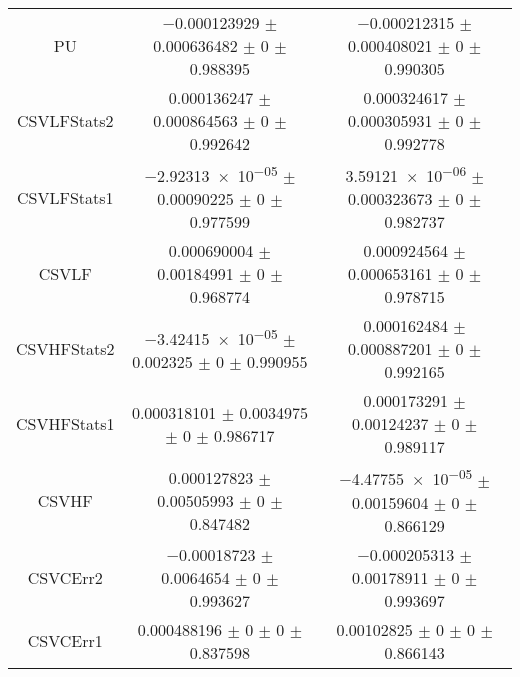 \begin{table}
\begin{tabular}{ccc}
PU & \num{-0.000123929} $\pm$ \num{0.000636482} $\pm$ \num{0} $\pm$ \num{0.988395} & \num{-0.000212315} $\pm$ \num{0.000408021} $\pm$ \num{0} $\pm$ \num{0.990305}\\
CSVLFStats2 & \num{0.000136247} $\pm$ \num{0.000864563} $\pm$ \num{0} $\pm$ \num{0.992642} & \num{0.000324617} $\pm$ \num{0.000305931} $\pm$ \num{0} $\pm$ \num{0.992778}\\
CSVLFStats1 & \num{-2.92313e-05} $\pm$ \num{0.00090225} $\pm$ \num{0} $\pm$ \num{0.977599} & \num{3.59121e-06} $\pm$ \num{0.000323673} $\pm$ \num{0} $\pm$ \num{0.982737}\\
CSVLF & \num{0.000690004} $\pm$ \num{0.00184991} $\pm$ \num{0} $\pm$ \num{0.968774} & \num{0.000924564} $\pm$ \num{0.000653161} $\pm$ \num{0} $\pm$ \num{0.978715}\\
CSVHFStats2 & \num{-3.42415e-05} $\pm$ \num{0.002325} $\pm$ \num{0} $\pm$ \num{0.990955} & \num{0.000162484} $\pm$ \num{0.000887201} $\pm$ \num{0} $\pm$ \num{0.992165}\\
CSVHFStats1 & \num{0.000318101} $\pm$ \num{0.0034975} $\pm$ \num{0} $\pm$ \num{0.986717} & \num{0.000173291} $\pm$ \num{0.00124237} $\pm$ \num{0} $\pm$ \num{0.989117}\\
CSVHF & \num{0.000127823} $\pm$ \num{0.00505993} $\pm$ \num{0} $\pm$ \num{0.847482} & \num{-4.47755e-05} $\pm$ \num{0.00159604} $\pm$ \num{0} $\pm$ \num{0.866129}\\
CSVCErr2 & \num{-0.00018723} $\pm$ \num{0.0064654} $\pm$ \num{0} $\pm$ \num{0.993627} & \num{-0.000205313} $\pm$ \num{0.00178911} $\pm$ \num{0} $\pm$ \num{0.993697}\\
CSVCErr1 & \num{0.000488196} $\pm$ \num{0} $\pm$ \num{0} $\pm$ \num{0.837598} & \num{0.00102825} $\pm$ \num{0} $\pm$ \num{0} $\pm$ \num{0.866143}\\
\bottomrule
\end{tabular}
\end{table}